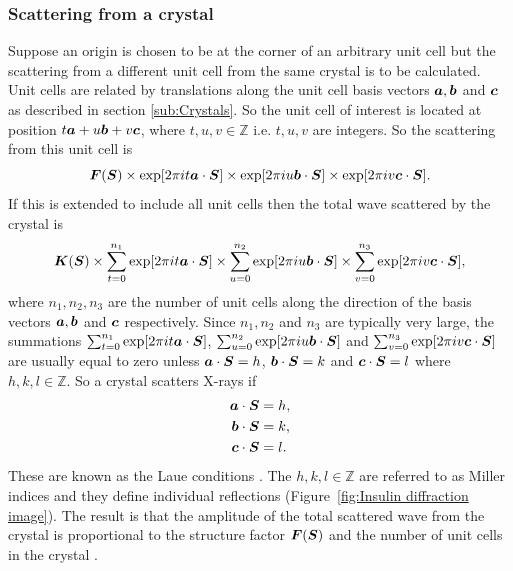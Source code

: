         \subsubsection{Scattering from a crystal}
        \label{subs:Scattering from a crystal}
            Suppose an origin is chosen to be at the corner of an arbitrary unit cell but the scattering from a different unit cell from the same crystal is to be calculated.
            Unit cells are related by translations along the unit cell basis vectors $\boldsymbol{a}, \boldsymbol{b}$ and  $\boldsymbol{c}$ as described in section \ref{sub:Crystals}. So the unit cell of interest is located at position $t\boldsymbol{a} + u\boldsymbol{b} + v\boldsymbol{c}$, where $t,u,v \in \mathbb{Z}$ i.e. $t,u,v$ are integers. So the scattering from this unit cell is
            \begin{equation}
                \boldsymbol{F}(\boldsymbol{S}) \times \exp[2\pi i t\boldsymbol{a} \cdot \boldsymbol{S}] \times \exp[2\pi i u\boldsymbol{b} \cdot \boldsymbol{S}] \times \exp[2\pi i v\boldsymbol{c} \cdot \boldsymbol{S}].
            \end{equation}
            If this is extended to include all unit cells then the total wave scattered by the crystal is
            \begin{equation}
                \boldsymbol{K}(\boldsymbol{S}) \times \sum_{t=0}^{n_1}\exp[2\pi i t\boldsymbol{a} \cdot \boldsymbol{S}] \times \sum_{u=0}^{n_2}\exp[2\pi i u\boldsymbol{b} \cdot \boldsymbol{S}] \times \sum_{v=0}^{n_3}\exp[2\pi i v\boldsymbol{c} \cdot \boldsymbol{S}],
            \end{equation}
            where $n_1, n_2, n_3$ are the number of unit cells along the direction of the basis vectors $\boldsymbol{a}, \boldsymbol{b}$ and $\boldsymbol{c}$ respectively.
            Since $n_1, n_2$ and $n_3$ are typically very large, the summations
            $\sum_{t=0}^{n_1}\exp[2\pi i t\boldsymbol{a} \cdot \boldsymbol{S}]$, $\sum_{u=0}^{n_2}\exp[2\pi i u\boldsymbol{b} \cdot \boldsymbol{S}]$ and $\sum_{v=0}^{n_3}\exp[2\pi i v\boldsymbol{c} \cdot \boldsymbol{S}]$
            are usually equal to zero unless $\boldsymbol{a} \cdot \boldsymbol{S} = h$, $\boldsymbol{b} \cdot \boldsymbol{S} = k$ and $\boldsymbol{c} \cdot \boldsymbol{S} = l$ where $h,k,l \in \mathbb{Z}$.
            So a crystal scatters X-rays if
            \begin{align}
                \boldsymbol{a} \cdot \boldsymbol{S} &= h, \\
                \boldsymbol{b} \cdot \boldsymbol{S} &= k, \\
                \boldsymbol{c} \cdot \boldsymbol{S} &= l.
                \label{eq:Laue conditions}
            \end{align}
            These are known as the Laue conditions \cite{drenth1999}. The $h,k,l \in \mathbb{Z}$ are referred to as Miller indices and they define individual reflections (Figure~\ref{fig:Insulin diffraction image}). The result is that the amplitude of the total scattered wave from the crystal is proportional to the structure factor $\boldsymbol{F}(\boldsymbol{S})$ and the number of unit cells in the crystal \cite{drenth1999}.

